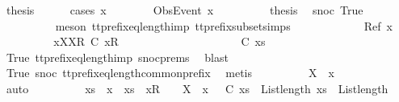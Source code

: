 \ {\isacharquery}thesis\isanewline
\ \ \ \ \isamarkupfalse%
\ {\isacharparenleft}cases\ x{\isacharparenright}\isanewline
\ \ \ \ \ \ \isamarkupfalse%
\ {\isacharparenleft}ObsEvent\ x{}{\isacharparenright}\isanewline
\ \ \ \ \ \ \isamarkupfalse%
\ \isamarkupfalse%
\ {\isacharquery}thesis\ \isamarkupfalse%
\ snoc\ True\isanewline
\ \ \ \ \ \ \ \ \isamarkupfalse%
\ {\isacharparenleft}meson\ tt{\isacharunderscore}prefix{\isacharunderscore}eq{\isacharunderscore}length{\isacharunderscore}imp\ tt{\isacharunderscore}prefix{\isacharunderscore}subset{\isachardot}simps{\isacharparenleft}{}{\isacharparenright}{\isacharparenright}\isanewline
\ \ \ \ \isamarkupfalse%
\isanewline
\ \ \ \ \ \ \isamarkupfalse%
\ {\isacharparenleft}Ref\ x{}{\isacharparenright}\isanewline
\ \ \ \ \ \ \isamarkupfalse%
\ \isamarkupfalse%
\ xX{}{\isacharcolon}{\isachardoublequoteopen}{\isacharbrackleft}{\isacharbrackleft}X{\isacharbrackright}\isactrlsub R{\isacharbrackright}\ {\isasymlesssim}\isactrlsub C\ {\isacharbrackleft}{\isacharbrackleft}x{}{\isacharbrackright}\isactrlsub R{\isacharbrackright}{\isachardoublequoteclose}\isanewline
\ \ \ \ \ \ \ \ \ \ \ \ \ \ \ \ \ \ \ \ {\isachardoublequoteopen}{\isasymrho}\ {\isasymlesssim}\isactrlsub C\ xs{\isachardoublequoteclose}\isanewline
\ \ \ \ \ \ \ \ \isamarkupfalse%
\ True\ tt{\isacharunderscore}prefix{\isacharunderscore}eq{\isacharunderscore}length{\isacharunderscore}imp\ snoc{\isachardot}prems{\isacharparenleft}{}{\isacharparenright}\ \isamarkupfalse%
\ blast\isanewline
\ \ \ \ \ \ \ \ \isamarkupfalse%
\ True\ snoc\ tt{\isacharunderscore}prefix{\isacharunderscore}eq{\isacharunderscore}length{\isacharunderscore}common{\isacharunderscore}prefix\ \isamarkupfalse%
\ metis\isanewline
\ \ \ \ \ \ \isamarkupfalse%
\ \isamarkupfalse%
\ {\isachardoublequoteopen}X\ {\isasymsubseteq}\ x{}{\isachardoublequoteclose}\ \isanewline
\ \ \ \ \ \ \ \ \isamarkupfalse%
\ auto\isanewline
\ \ \ \ \ \ \isamarkupfalse%
\ \isamarkupfalse%
\ {\isachardoublequoteopen}xs\ {\isacharat}\ {\isacharbrackleft}x{\isacharbrackright}\ {\isacharequal}\ xs\ {\isacharat}\ {\isacharbrackleft}{\isacharbrackleft}x{}{\isacharbrackright}\isactrlsub R{\isacharbrackright}\ {\isacharat}\ {\isacharbrackleft}{\isacharbrackright}\ {\isasymand}\ X\ {\isasymsubseteq}\ x{}\ {\isasymand}\ {\isasymrho}\ {\isasymlesssim}\isactrlsub C\ xs\ {\isasymand}\ List{\isachardot}length\ {\isacharparenleft}xs{\isacharparenright}\ {\isacharequal}\ List{\isachardot}length\ {\isacharparenleft}{\isasymrho}{\isacharparenright}{\isachardoublequoteclose}\isanewline
